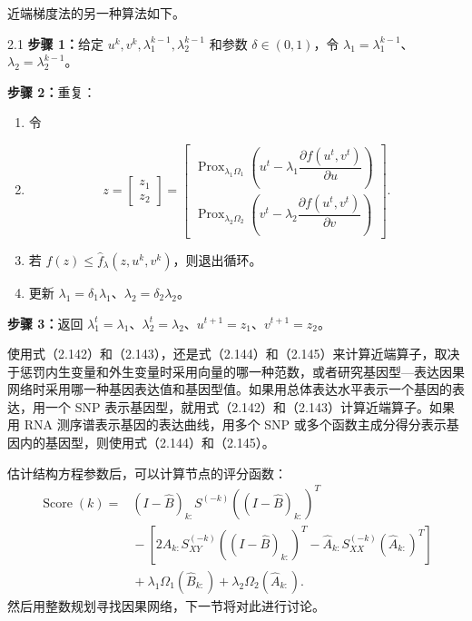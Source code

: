 近端梯度法的另一种算法如下。
\begin{bookalgorithm}{2.1}
\noindent\textbf{步骤 1：}给定 $u^k,v^k,\lambda_1^{k-1},\lambda_2^{k-1}$ 和参数 $\delta\in(0,1)$，令 $\lambda_1=\lambda_1^{k-1}$、$\lambda_2=\lambda_2^{k-1}$。

\noindent\textbf{步骤 2：}重复：
\begin{enumerate}
\item 令
\item
\[
z=\begin{bmatrix}z_1\\z_2\end{bmatrix}
=\begin{bmatrix}
\operatorname{Prox}_{\lambda_1\Omega_1}
\left(u^t-\lambda_1\dfrac{\partial f(u^t,v^t)}{\partial u}\right)\\
\operatorname{Prox}_{\lambda_2\Omega_2}
\left(v^t-\lambda_2\dfrac{\partial f(u^t,v^t)}{\partial v}\right)
\end{bmatrix}.
\]
\item 若 $f(z)\leq\widehat f_\lambda(z,u^k,v^k)$，则退出循环。
\item 更新 $\lambda_1=\delta_1\lambda_1$、$\lambda_2=\delta_2\lambda_2$。
\end{enumerate}
\noindent\textbf{步骤 3：}返回 $\lambda_1^t=\lambda_1$、$\lambda_2^t=\lambda_2$、$u^{t+1}=z_1$、$v^{t+1}=z_2$。
\end{bookalgorithm}
使用式（2.142）和（2.143），还是式（2.144）和（2.145）来计算近端算子，取决于惩罚内生变量和外生变量时采用向量的哪一种范数，或者研究基因型—表达因果网络时采用哪一种基因表达值和基因型值。如果用总体表达水平表示一个基因的表达，用一个 SNP 表示基因型，就用式（2.142）和（2.143）计算近端算子。如果用 RNA 测序谱表示基因的表达曲线，用多个 SNP 或多个函数主成分得分表示基因内的基因型，则使用式（2.144）和（2.145）。

估计结构方程参数后，可以计算节点的评分函数：
\begin{equation}
\begin{aligned}
\operatorname{Score}(k)={}&
(I-\widehat B)_{k:}S^{(-k)}
\left((I-\widehat B)_{k:}\right)^T\\
&{}-\left[
2A_{k:}S_{XY}^{(-k)}\left((I-\widehat B)_{k:}\right)^T
-\widehat A_{k:}S_{XX}^{(-k)}(\widehat A_{k:})^T\right]\\
&{}+\lambda_1\Omega_1(\widehat B_{k:})
+\lambda_2\Omega_2(\widehat A_{k:}).
\end{aligned}\tag{2.149}
\end{equation}
然后用整数规划寻找因果网络，下一节将对此进行讨论。
\FloatBarrier
